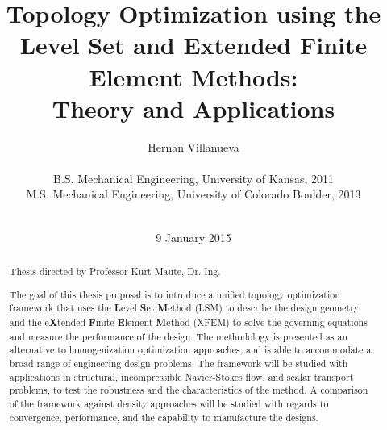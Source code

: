\documentclass[12pt,letterpaper]{report}
\begin{document}
\title{Topology Optimization using the Level Set and Extended Finite Element Methods: \\Theory and Applications}
    
\author{
Hernan Villanueva \\ \\
B.S. Mechanical Engineering, University of Kansas, 2011 \\
M.S. Mechanical Engineering, University of Colorado Boulder, 2013 \\ \\}

\date{9 January 2015}

\maketitle

\begin{abstract}
Thesis directed by Professor Kurt Maute, Dr.-Ing.

The goal of this thesis proposal is to introduce a unified topology optimization framework that uses the \textbf{L}evel \textbf{S}et \textbf{M}ethod (LSM) to describe the design geometry and the e\textbf{X}tended \textbf{F}inite \textbf{E}lement \textbf{M}ethod (XFEM) to solve the governing equations and measure the performance of the design. The methodology is presented as an alternative to homogenization optimization approaches, and is able to accommodate a broad range of engineering design problems. The framework will be studied with applications in structural, incompressible Navier-Stokes flow, and scalar transport problems, to test the robustness and the characteristics of the method. A comparison of the framework against density approaches will be studied with regards to convergence, performance, and the capability to manufacture the designs.
\end{abstract}


\tableofcontents
\listoffigures
\listoftables




\end{document}
